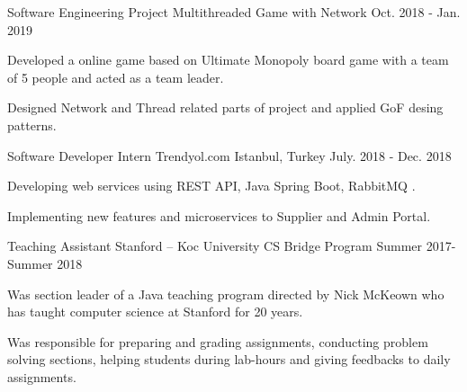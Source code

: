 
\begin{cventries}
  \cventry
   {Software Engineering Project} %
    {Multithreaded Game with Network} %
    {} %
    {Oct. 2018 - Jan. 2019} %
    {
      \begin{cvitems} %
      	\item {Developed a online game based on Ultimate Monopoly board game with a team of 5 people and acted as a team leader.} 
      	\item {Designed Network and Thread related parts of project and applied GoF desing patterns.} 
      \end{cvitems}
    }

  \cventry
   {Software Developer Intern} %
    {Trendyol.com} %
    {Istanbul, Turkey} %
    {July. 2018 - Dec. 2018} %
    {
      \begin{cvitems} %
		\item {Developing web services using REST API, Java Spring Boot, RabbitMQ .}
        \item {Implementing new features and microservices to Supplier and Admin Portal.}
      \end{cvitems}
    }
  \cventry
    {Teaching Assistant } %
    {Stanford – Koc University CS Bridge Program} %
    {} %
    {Summer 2017-Summer 2018} %
    {
      \begin{cvitems} %
        \item {Was section leader of a Java teaching program directed by Nick McKeown who has taught computer science at Stanford for 20 years.}
        \item {Was responsible for preparing and grading assignments, conducting problem solving sections, helping students during lab-hours and giving feedbacks to daily assignments.}
      \end{cvitems}
    }
  

\end{cventries}
